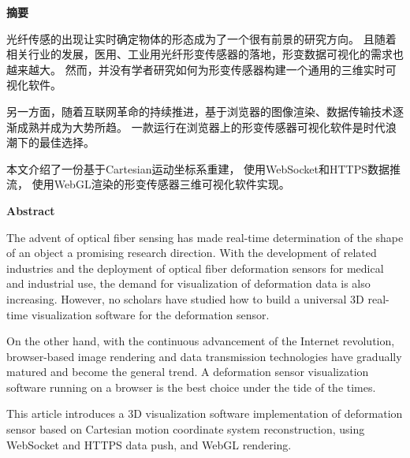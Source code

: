 \cleardoublepage{}
\begin{center}
    \bfseries {} 摘要
\end{center}

光纤传感的出现让实时确定物体的形态成为了一个很有前景的研究方向。
且随着相关行业的发展，医用、工业用光纤形变传感器的落地，形变数据可视化的需求也越来越大。
然而，并没有学者研究如何为形变传感器构建一个通用的三维实时可视化软件。

另一方面，随着互联网革命的持续推进，基于浏览器的图像渲染、数据传输技术逐渐成熟并成为大势所趋。
一款运行在浏览器上的形变传感器可视化软件是时代浪潮下的最佳选择。

本文介绍了一份基于Cartesian运动坐标系重建，
使用WebSocket和HTTPS数据推流，
使用WebGL渲染的形变传感器三维可视化软件实现。

\cleardoublepage{}
\begin{center}
    \bfseries {} Abstract
\end{center}

The advent of optical fiber sensing has made real-time determination of the shape of an object a promising research direction. 
With the development of related industries and the deployment of optical fiber deformation sensors for medical and industrial use, 
the demand for visualization of deformation data is also increasing. 
However, no scholars have studied how to build a universal 3D real-time visualization software for the deformation sensor.

On the other hand, with the continuous advancement of the Internet revolution, 
browser-based image rendering and data transmission technologies have gradually matured and become the general trend. 
A deformation sensor visualization software running on a browser is the best choice under the tide of the times.

This article introduces a 3D visualization software implementation of deformation sensor 
based on Cartesian motion coordinate system reconstruction, using WebSocket and HTTPS data push, and WebGL rendering.